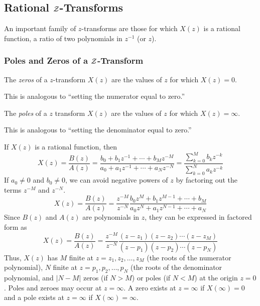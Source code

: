 \subsection{Rational \texorpdfstring{$\operatorname{\mathcal{Z}}$-Transforms}{Z-Transform}}\label{subsec:Rational Z-Transforms}
An important family of $z$-transforms are those for which $X(z)$ is a rational function, a ratio of two polynomials in $z^{-1}$ (or $z$).

\subsubsection{Poles and Zeros of a \texorpdfstring{$\operatorname{\mathcal{Z}}$-Transform}{Z-Transform}}\label{subsubsec:Poles and Zeros of Z-Transform}
\begin{definition}[Zeros]\label{def:Zeros of a Z-Transform}
  The \emph{zeros} of a $z$-transform $X(z)$ are the values of $z$ for which $X(z)=0$.

  This is analogous to ``setting the numerator equal to zero.''
\end{definition}
\begin{definition}[Poles]\label{def:Poles of a Z-Transform}
  The \emph{poles} of a $z$ transform $X(z)$ are the values of $z$ for which $X(z)=\infty$.

  This is analogous to ``setting the denominator equal to zero.''
\end{definition}

If $X(z)$ is a rational function, then
\begin{equation*}
  X(z) = \frac{B(z)}{A(z)} = \frac{b_{0} + b_{1}z^{-1} + \cdots + b_{M}z^{-M}}{a_{0} + a_{1}z^{-1} + \cdots + a_{N}z^{-N}} = \frac{\sum_{k=0}^{M} b_{k}z^{-k}}{\sum_{k=0}^{N} a_{k}z^{-k}}
\end{equation*}
If $a_{0} \neq 0$ and $b_{0} \neq 0$, we can avoid negative powers of $z$ by factoring out the terms $z^{-M}$ and $z^{-N}$.
\begin{equation*}
  X(z) = \frac{B(z)}{A(z)} = \frac{z^{-M}}{z^{-N}} \frac{b_{0}z^{M} + b_{1}z^{M-1} + \cdots + b_{M}}{a_{0}z^{N} + a_{1}z^{N-1} + \cdots + a_{N}}
\end{equation*}
Since $B(z)$ and $A(z)$ are polynomials in $z$, they can be expressed in factored form as
\begin{equation}\label{eq:Rational Z-Transform Poles and Zeros Factored}
  X(z) = \frac{B(z)}{A(z)} = \frac{z^{-M}}{z^{-N}} \frac{(z-z_{1})(z-z_{2}) \cdots (z-z_{M})}{(z-p_{1})(z-p_{2}) \cdots (z-p_{N})}
\end{equation}
Thus, $X(z)$ has $M$ finite  at $z=z_{1},z_{2}, \ldots, z_{M}$ (the roots of the numerator polynomial), $N$ finite  at $z=p_{1},p_{2}, \ldots, p_{N}$ (the roots of the denominator polynomial, and $\lvert N-M \rvert$ zeros (if $N>M$) or poles (if $N<M$) at the origin $z=0$.
Poles and zeroes may occur at $z=\infty$.
A zero exists at $z=\infty$ if $X(\infty) = 0$ and a pole exists at $z=\infty$ if $X(\infty) = \infty$.

